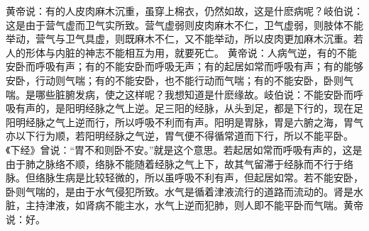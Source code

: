 \documentclass[a4paper,12pt,UTF8,twoside]{ctexbook}
\begin{document}
黄帝说：有的人皮肉麻木沉重，虽穿上棉衣，仍然如故，这是什麽病呢？岐伯说：这是由于营气虚而卫气实所致。营气虚弱则皮肉麻木不仁，卫气虚弱，则肢体不能举动，营气与卫气具虚，则既麻木不仁，又不能举动，所以皮肉更加麻木沉重。若人的形体与内脏的神志不能相互为用，就要死亡。
黄帝说：人病气逆，有的不能安卧而呼吸有声；有的不能安卧而呼吸无声；有的起居如常而呼吸有声；有的能够安卧，行动则气喘；有的不能安卧，也不能行动而气喘；有的不能安卧，卧则气喘。是哪些脏腑发病，使之这样呢？我想知道是什麽缘故。岐伯说：不能安卧而呼吸有声的，是阳明经脉之气上逆。足三阳的经脉，从头到足，都是下行的，现在足阳明经脉之气上逆而行，所以呼吸不利而有声。阳明是胃脉，胃是六腑之海，胃气亦以下行为顺，若阳明经脉之气逆，胃气便不得循常道而下行，所以不能平卧。《下经》曾说：“胃不和则卧不安。”就是这个意思。若起居如常而呼吸有声的，这是由于肺之脉络不顺，络脉不能随着经脉之气上下，故其气留滞于经脉而不行于络脉。但络脉生病是比较轻微的，所以虽呼吸不利有声，但起居如常。若不能安卧，卧则气喘的，是由于水气侵犯所致。水气是循着津液流行的道路而流动的。肾是水脏，主持津液，如肾病不能主水，水气上逆而犯肺，则人即不能平卧而气喘。黄帝说：好。

\part{}
\end{document}
